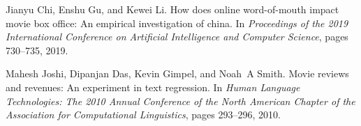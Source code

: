 \documentclass[review]{cvpr}
\begin{document}
{\begin{thebibliography}{10}
Jianyu Chi, Enshu Gu, and Kewei Li.
\newblock How does online word-of-mouth impact movie box office: An empirical
  investigation of china.
\newblock In {\em Proceedings of the 2019 International Conference on
  Artificial Intelligence and Computer Science}, pages 730--735, 2019.


Mahesh Joshi, Dipanjan Das, Kevin Gimpel, and Noah~A Smith.
\newblock Movie reviews and revenues: An experiment in text regression.
\newblock In {\em Human Language Technologies: The 2010 Annual Conference of
  the North American Chapter of the Association for Computational Linguistics},
  pages 293--296, 2010.



\end{thebibliography}

}
\end{document}
